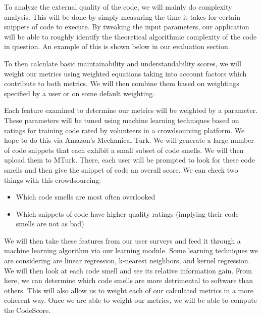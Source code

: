 \documentclass{sig-alternate}
\begin{document}
To analyze the external quality of the code, we will mainly do complexity analysis. This will be done by simply measuring the time it takes for certain snippets of code to execute. By tweaking the input parameters, our application will be able to roughly identify the theoretical algorithmic complexity of the code in question. An example of this is shown below in our evaluation section.

To then calculate basic maintainability and understandability scores, we will weight our metrics using weighted equations taking into account factors which contribute to both metrics. We will then combine them based on weightings specified by a user or on some default weighting.

Each feature examined to determine our metrics will be weighted by a parameter. These parameters will be tuned using machine learning techniques based on ratings for training code rated by volunteers in a crowdsourcing platform. We hope to do this via Amazon's Mechanical Turk. We will generate a large number of code snippets that each exhibit a small subset of code smells. We will then upload them to MTurk. There, each user will be prompted to look for these code smells and then give the snippet of code an overall score. We can check two things with this crowdsourcing:

\begin{itemize}
\item Which code smells are most often overlooked
\item Which snippets of code have higher quality ratings (implying their code smells are not as bad)
\end{itemize}

We will then take these features from our user surveys and feed it through a machine learning algorithm via our learning module. Some learning techniques we are considering are linear regression, k-nearest neighbors, and kernel regression. We will then look at each code smell and see its relative information gain. From here, we can determine which code smells are more detrimental to software than others. This will also allow us to weight each of our calculated metrics in a more coherent way. Once we are able to weight our metrics, we will be able to compute the CodeScore.
\end{document}
